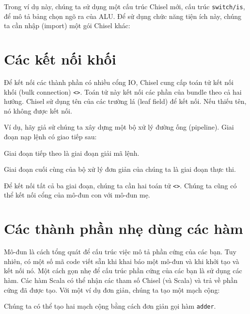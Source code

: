 \documentclass[%
    10pt,
    headinclude, footexclude,
    openright, %
    notitlepage,
    cleardoubleempty,
    headsepline,
    pointlessnumbers,
    bibtotoc, idxtotoc,
    ]{scrbook}
\newcommand{\code}[1]{{\small{\texttt{#1}}}}
\begin{document}
\noindent Trong ví dụ này, chúng ta sử dụng một cấu trúc Chisel mới, cấu trúc \code{switch/is}, 
để mô tả bảng chọn ngõ ra của ALU. Để sử dụng chức năng tiện ích này, chúng ta cần nhập (import) một gói Chisel khác:


\section{Các kết nối khối}


Để kết nối các thành phần có nhiều cổng IO, Chisel cung cấp toán tử 
kết nối khối (bulk connection) \code{<>}. Toán tử này kết nối các phần của bundle theo cả hai hướng. 
Chisel sử dụng tên của các trường lá (leaf field) để kết nối. Nếu thiếu tên, nó không được kết nối.

Ví dụ, hãy giả sử chúng ta xây dựng một bộ xử lý đường ống (pipeline). Giai đoạn nạp lệnh có giao tiếp sau:


\noindent Giai đoạn tiếp theo là giai đoạn giải mã lệnh.

\noindent Giai đoạn cuối cùng của bộ xử lý đơn giản của chúng ta là giai đoạn thực thi.

Để kết nối tất cả ba giai đoạn, chúng ta cần hai toán tử \code{<>}.
Chúng ta cũng có thể kết nối cổng của mô-đun con với mô-đun mẹ.


\section{Các thành phần nhẹ dùng các hàm}
\label{sec:functions}


Mô-đun là cách tổng quát để cấu trúc việc mô tả phần cứng của các bạn.
Tuy nhiên, có một số mã  code viết sẵn khi khai báo một mô-đun và khi khởi tạo và kết nối nó.
Một cách gọn nhẹ để cấu trúc phần cứng của các bạn là sử dụng các hàm.
Các hàm Scala có thể nhận các tham số Chisel (và Scala) và trả về phần cứng đã được tạo.
Với một ví dụ đơn giản, chúng ta tạo một mạch cộng:


\noindent Chúng ta có thể tạo hai mạch cộng bằng cách đơn giản gọi hàm \code{adder}.
\end{document}
